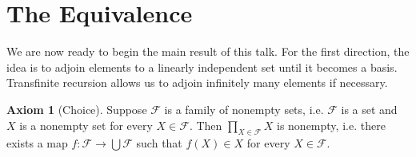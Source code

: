 \documentclass[12pt]{article}
\theoremstyle{definition}
\newtheorem*{axiom}{\color{purple} Axiom}
\begin{document}
\section*{The Equivalence}

We are now ready to begin the main result of this talk. For the first direction, the idea is to adjoin elements to a linearly independent set until it becomes a basis. Transfinite recursion allows us to adjoin infinitely many elements if necessary.

\begin{axiom}[Choice]
	Suppose $\mathcal{F}$ is a family of nonempty sets, i.e. $\mathcal{F}$ is a set and $X$ is a nonempty set for every $X\in\mathcal{F}$. Then $\prod_{X\in\mathcal{F}} X$ is nonempty, i.e. there exists a map $f: \mathcal{F}\rightarrow\bigcup\mathcal{F}$ such that $f(X)\in X$ for every $X\in\mathcal{F}$.
\end{axiom}
\end{document}
